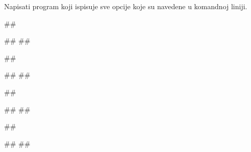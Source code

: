 \begin{Exercise}[label=v2.2_01] 
 Napisati program koji ispisuje sve opcije koje su navedene u komandnoj liniji.
 
\begin{miditest}
\begin{upotreba}{1}
##

#\naslovIzlaz#
##
\end{upotreba}
\end{miditest}
\begin{miditest}
\begin{upotreba}{2}
##

#\naslovIzlaz#
##
\end{upotreba}
\end{miditest}

\begin{miditest}
\begin{upotreba}{3}
##

#\naslovIzlaz#
##
\end{upotreba}
\end{miditest}
\begin{miditest}
\begin{upotreba}{4}
##

#\naslovIzlaz#
##
\end{upotreba}
\end{miditest}

\end{Exercise}
\ifresenja
\begin{Answer}[ref=v2.2_01]
\end{Answer}
 \fi


